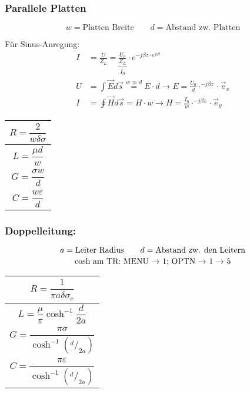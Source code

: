 \subsubsection{Parallele Platten}
{\small\[
	w  = \text{Platten Breite} \qquad d  = \text{Abstand zw. Platten}
	\]}

Für Sinus-Anregung:
\begin{align*}
	I & = \frac{U}{Z_L} = \underbrace{\frac{U_0}{Z_L}}_{I_0}\cdot e^{-j\beta z\cdot e^{j\omega t}}                         \\
	U & = \int \vec{E} d\vec{s} \stackrel{w\gg d}{=} E\cdot d \rightarrow E = \frac{U_0}{d}\cdot^{-j\beta z}\cdot\vec{e}_x \\
	I & = \oint \vec{H} d\vec{s} =  H\cdot w \rightarrow H = \frac{I_0}{w}\cdot^{-j\beta z}\cdot\vec{e}_y                  %
\end{align*}


{\renewcommand*{\arraystretch}{0.2}
	\begin{tabularx}{0.5\columnwidth}{|X|}
		\hline
		\[R=\frac{2}{w\delta\sigma}\] \\
		\hline
		\[L=\frac{\mu d}{w}\]         \\
		\hline
		\[G=\frac{\sigma w}{d}\]      \\
		\hline
		\[C=\frac{w\varepsilon}{d}\]  \\
		\hline
	\end{tabularx}
}

\subsubsection{Doppelleitung:}
{\small\[
	a = \text{Leiter Radius} \qquad d = \text{Abstand zw. den Leitern}\\
	\]}
{\small\[
	\text{cosh am TR: MENU $\rightarrow$ 1; OPTN $\rightarrow$ 1 $\rightarrow$ 5}\\
	\]}

{\renewcommand*{\arraystretch}{0.2}
	\begin{tabularx}{0.5\columnwidth}{|X|}
		\hline
		\[R  = \frac{1}{\pi a\delta\sigma_c}\]              \\
		\hline
		\[L = \frac{\mu}{\pi} \cosh^{-1}\frac{d}{2a}\]      \\
		\hline
		\[G = \frac{\pi\sigma}{\cosh^{-1}(^d/_{2a})}\]      \\
		\hline
		\[C = \frac{\pi\varepsilon}{\cosh^{-1}(^d/_{2a})}\] \\
		\hline
\end{tabularx}}

